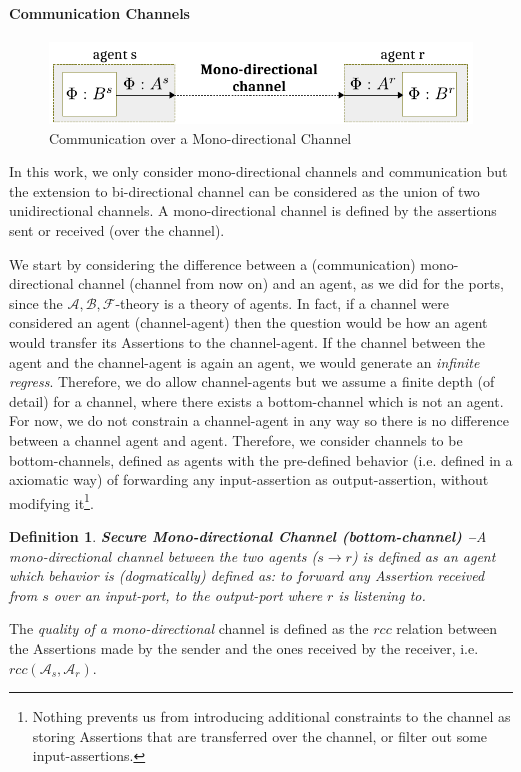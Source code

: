 \documentclass[conference]{IEEEtran}
\newcommand{\assertionRegion}{\mathcal{A}}
\newcommand{\beliefRegion}{\mathcal{B}}
\newcommand{\factRegion}{\mathcal{F}}
\newcommand{\rcc}{rcc}
\newcommand{\abf}{\assertionRegion,\beliefRegion,\factRegion}
\newcommand{\Rcc}[2]{rcc(#1,#2)}
\newtheorem{definition}{Definition}%
\begin{document}
\paragraph{Communication Channels}
\begin{figure}[t]
	\centering
	\includegraphics[width=\columnwidth]{channel.pdf}
	\caption{Communication over a Mono-directional Channel}
	\label{fig:channel}
\end{figure}
In this work, we only consider
mono-directional channels and communication but the extension to bi-directional
channel can be considered as the union of two unidirectional channels. A
mono-directional channel is defined by the assertions sent or received (over
the channel). 

We start by considering the difference between a (communication)
mono-directional channel (channel from now on) and an agent, as we did for the
ports, since the $\abf$-theory is a theory of agents.  In fact, if a channel
were considered an agent (channel-agent) then the question would be how an
agent would transfer its Assertions to the channel-agent. If the channel
between the agent and the channel-agent is again an agent, we would generate an
\emph{infinite regress}. Therefore, we do allow channel-agents but we assume a
finite depth (of detail) for a channel, where there exists a bottom-channel
which is not an agent. For now, we do not constrain a channel-agent in any way
so there is no difference between a channel agent and agent. Therefore,
we consider channels to be bottom-channels,
defined as agents with the pre-defined behavior (i.e. defined in a axiomatic
way) of forwarding any input-assertion as output-assertion, without modifying it\footnote{Nothing
prevents us from introducing additional constraints to the channel as storing
Assertions that are transferred over the channel, or filter out some
input-assertions.}. 

\begin{definition}{\bf Secure Mono-directional Channel (bottom-channel) --}\label{def:monochannel}
	A mono-directional channel between the two agents ($s \rightarrow r$) is defined as 
	an agent which behavior is (dogmatically) defined as: to forward any Assertion received from $s$ over an input-port, to  
	the output-port where $r$ is listening to.
\end{definition}
The \emph{quality of a mono-directional} channel is defined as the $\rcc$
relation between the Assertions made by the sender and the ones received by the
receiver, i.e. $\Rcc{\assertionRegion_s}{\assertionRegion_r}$.
\end{document}
